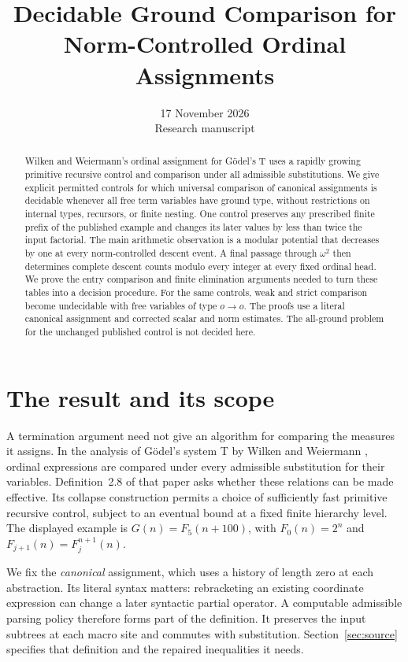 \documentclass[11pt,a4paper]{article}
\title{Decidable Ground Comparison for\\Norm-Controlled Ordinal Assignments}
\author{}
\date{17 November 2026\\Research manuscript}
\numberwithin{equation}{section}
\theoremstyle{definition}
\theoremstyle{remark}
\begin{document}
\maketitle
\begin{abstract}
Wilken and Weiermann's ordinal assignment for G\"odel's T uses a rapidly
growing primitive recursive control and comparison under all admissible
substitutions. We give explicit permitted controls for which universal
comparison of canonical assignments is decidable whenever all free term
variables have ground type, without restrictions on internal types,
recursors, or finite nesting. One control preserves any prescribed finite
prefix of the published example and changes its later values by less than
twice the input factorial. The main arithmetic observation is a modular
potential that decreases by one at every norm-controlled descent event.
A final passage through \(\omega^2\) then determines complete descent
counts modulo every integer at every fixed ordinal head. We prove the
entry comparison and finite elimination arguments needed to turn these
tables into a decision procedure. For the same controls, weak and strict
comparison become undecidable with free variables of type \(o\to o\).
The proofs use a literal canonical assignment and corrected scalar and
norm estimates. The all-ground problem for the unchanged published
control is not decided here.
\end{abstract}
\tableofcontents

\section{The result and its scope}\label{sec:introduction}

A termination argument need not give an algorithm for comparing the
measures it assigns. In the analysis of G\"odel's system T by Wilken and
Weiermann \cite{ww}, ordinal expressions are compared under every
admissible substitution for their variables. Definition~2.8 of that
paper asks whether these relations can be made effective. Its collapse
construction permits a choice of sufficiently fast primitive recursive
control, subject to an eventual bound at a fixed finite hierarchy level.
The displayed example is \(G(n)=F_5(n+100)\), with
\(F_0(n)=2^n\) and \(F_{j+1}(n)=F_j^{n+1}(n)\).

We fix the \emph{canonical} assignment, which uses a history of length
zero at each abstraction. Its literal syntax matters: rebracketing an
existing coordinate expression can change a later syntactic partial
operator. A computable admissible parsing policy therefore forms part of
the definition. It preserves the input subtrees at each macro site and
commutes with substitution. Section~\ref{sec:source} specifies that
definition and the repaired inequalities it needs.
\end{document}
